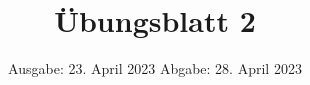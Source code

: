 

\title{Übungsblatt 2}
\date{%
  Ausgabe: 23. April 2023 %
  \hspace{3em}
  Abgabe:  28. April 2023 %
}



\maketitle
\thispagestyle{empty}
\tableofcontents
\newpage






